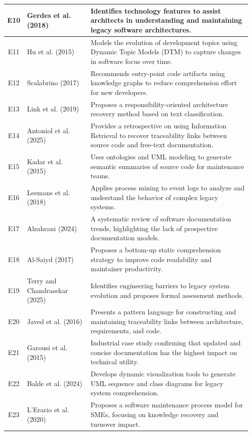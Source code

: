 \documentclass{ieeeaccess}
\begin{document}
\begin{table}[h]
\begin{tabular}{|c|p{150pt}|p{300pt}|}
E10 & Gerdes et al. (2018) \cite{e10} & Identifies technology features to assist architects in understanding and maintaining legacy software architectures. \\ \hline
E11 & Hu et al. (2015) \cite{e15} & Models the evolution of development topics using Dynamic Topic Models (DTM) to capture changes in software focus over time. \\ \hline
E12 & Scalabrino (2017) \cite{e12} & Recommends entry-point code artifacts using knowledge graphs to reduce comprehension effort for new developers. \\ \hline
E13 & Link et al. (2019) \cite{e13} & Proposes a responsibility-oriented architecture recovery method based on text classification. \\ \hline
E14 & Antoniol et al. (2025) \cite{antoniol} & Provides a retrospective on using Information Retrieval to recover traceability links between source code and free-text documentation. \\ \hline
E15 & Kadar et al. (2015) \cite{e15} & Uses ontologies and UML modeling to generate semantic summaries of source code for maintenance teams. \\ \hline
E16 & Leemans et al. (2018) \cite{e16} & Applies process mining to event logs to analyze and understand the behavior of complex legacy systems. \\ \hline
E17 & Alzahrani (2024) \cite{e17} & A systematic review of software documentation trends, highlighting the lack of prospective documentation models. \\ \hline
E18 & Al-Saiyd (2017) \cite{e18} & Proposes a bottom-up static comprehension strategy to improve code readability and maintainer productivity. \\ \hline
E19 & Terry and Chandrasekar (2025) \cite{e19} & Identifies engineering barriers to legacy system evolution and proposes formal assessment methods. \\ \hline
E20 & Javed et al. (2016) \cite{e20} & Presents a pattern language for constructing and maintaining traceability links between architecture, requirements, and code. \\ \hline
E21 & Garousi et al. (2015) \cite{garousi} & Industrial case study confirming that updated and concise documentation has the highest impact on technical utility. \\ \hline
E22 & Balde et al. (2024) \cite{e22} & Develops dynamic visualization tools to generate UML sequence and class diagrams for legacy system comprehension. \\ \hline
E23 & L’Erario et al. (2020) \cite{e23} & Proposes a software maintenance process model for SMEs, focusing on knowledge recovery and turnover impact. \\ \hline
\end{tabular}
\end{table}
\end{document}
